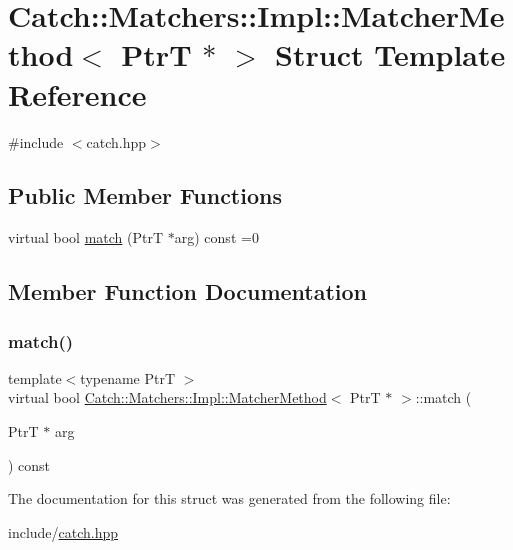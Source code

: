 \hypertarget{struct_catch_1_1_matchers_1_1_impl_1_1_matcher_method_3_01_ptr_t_01_5_01_4}{}\section{Catch\+:\+:Matchers\+:\+:Impl\+:\+:Matcher\+Method$<$ PtrT $\ast$ $>$ Struct Template Reference}
\label{struct_catch_1_1_matchers_1_1_impl_1_1_matcher_method_3_01_ptr_t_01_5_01_4}


{\ttfamily \#include $<$catch.\+hpp$>$}

\subsection*{Public Member Functions}
\begin{DoxyCompactItemize}
\item 
virtual bool \mbox{\hyperlink{struct_catch_1_1_matchers_1_1_impl_1_1_matcher_method_3_01_ptr_t_01_5_01_4_a5fdd64f9509724f32ffc73cb320181d1}{match}} (PtrT $\ast$arg) const =0
\end{DoxyCompactItemize}


\subsection{Member Function Documentation}
\mbox{\label{struct_catch_1_1_matchers_1_1_impl_1_1_matcher_method_3_01_ptr_t_01_5_01_4_a5fdd64f9509724f32ffc73cb320181d1}} 
\subsubsection{\texorpdfstring{match()}{match()}}
{\footnotesize\ttfamily template$<$typename PtrT $>$ \\
virtual bool \mbox{\hyperlink{struct_catch_1_1_matchers_1_1_impl_1_1_matcher_method}{Catch\+::\+Matchers\+::\+Impl\+::\+Matcher\+Method}}$<$ PtrT $\ast$ $>$\+::match (\begin{DoxyParamCaption}\item[{PtrT $\ast$}]{arg }\end{DoxyParamCaption}) const\hspace{0.3cm}{\ttfamily [pure virtual]}}



The documentation for this struct was generated from the following file\+:\begin{DoxyCompactItemize}
\item 
include/\mbox{\hyperlink{catch_8hpp}{catch.\+hpp}}\end{DoxyCompactItemize}
